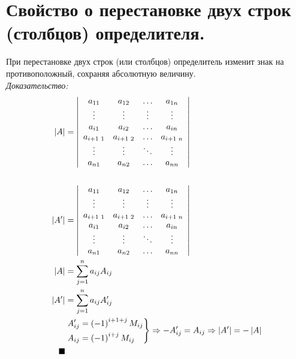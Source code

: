 \documentclass[12pt, fleqn]{article}
\begin{document}
\section{Свойство о перестановке двух строк (столбцов) определителя.}
При перестановке двух строк (или столбцов) определитель изменит знак на противоположный, сохраняя абсолютную величину.\\
\textit{Доказательство:}\\
\begin{align*}
	\left|A\right|&=
	\left|
	\begin{array}{cccc}
		a_{11} & a_{12} & \ldots & a_{1n}\\
		\vdots&\vdots&\vdots&\vdots\\
		a_{i1} & a_{i2} & \ldots & a_{in}\\
		a_{i+1 \text{\space}1} & a_{i+1 \text{\space}2} & \ldots & a_{i+1\text{\space} n}\\
		\vdots & \vdots & \ddots & \vdots\\
		a_{n1} & a_{n2} & \ldots & a_{nn}
	\end{array}
	\right|\\\\
	\left|A^\prime\right|&=
	\left|
	\begin{array}{cccc}
		a_{11} & a_{12} & \ldots & a_{1n}\\
		\vdots&\vdots&\vdots&\vdots\\
		a_{i+1 \text{\space}1} & a_{i+1 \text{\space}2} & \ldots & a_{i+1\text{\space} n}\\
		a_{i1} & a_{i2} & \ldots & a_{in}\\
		\vdots & \vdots & \ddots & \vdots\\
		a_{n1} & a_{n2} & \ldots & a_{nn}
	\end{array}
	\right|\\
	\left|A\right|&=\sum_{j=1}^{n}a_{ij}A_{ij}\\
	\left|A^\prime\right|&=\sum_{j=1}^{n}a_{ij}A_{ij}^\prime\\
	&\left.\begin{gathered}
		\begin{aligned}
			A_{ij}^\prime &= \left(-1\right)^{i+1+j}M_{ij}\\
			A_{ij} &= \left(-1\right)^{i+j}M_{ij}\\
		\end{aligned}
	\end{gathered}\right\} \Rightarrow -A_{ij}^\prime = A_{ij}\Rightarrow \left|A^\prime\right|=-\left|A\right|\\
	\blacksquare\\
\end{align*}
\end{document}
